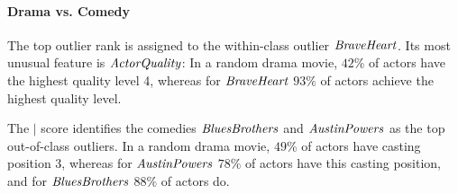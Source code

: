 \documentclass[conference]{IEEEtran}
\begin{document}
								\paragraph{Drama vs. Comedy} 
								The top outlier rank is assigned to the within-class outlier $\it{Brave Heart}$. Its most  unusual feature is  $\it{ActorQuality}$: In a random drama movie,  $42\%$ of actors have the highest quality level 4, whereas for $\it{Brave Heart}$ $93\%$ of actors achieve the highest quality level. 
								
								The  $\mid$ score identifies the comedies  $\it{Blues Brothers}$ and $\it{Austin Powers}$ as the top out-of-class outliers. 
								In a random drama movie,  $49\%$ of actors have casting position 3, whereas for $\it{Austin Powers}$ $78\%$ of actors have this casting position, and for $\it{Blues Brothers}$ $88\%$ of actors do. 
\end{document}

